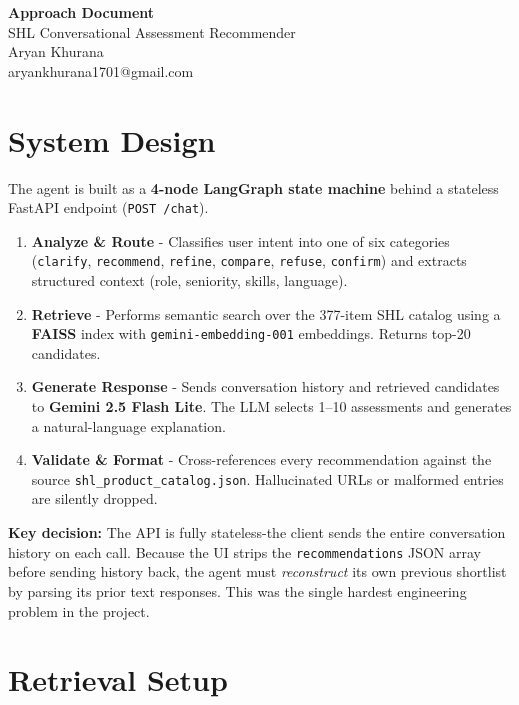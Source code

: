 \documentclass[11pt, a4paper]{article}
\begin{document}
\begin{center}
    {\LARGE \textbf{Approach Document}} \\[0.3em]
    {\large SHL Conversational Assessment Recommender} \\[0.2em]
    {\normalsize Aryan Khurana} \\[0.1em]
    {\normalsize aryankhurana1701@gmail.com}
\end{center}

\vspace{0.5em}

\section{System Design}

The agent is built as a \textbf{4-node LangGraph state machine} behind a stateless FastAPI endpoint (\texttt{POST /chat}).

\begin{enumerate}[leftmargin=1.5em, nosep]
    \item \textbf{Analyze \& Route} - Classifies user intent into one of six categories (\texttt{clarify}, \texttt{recommend}, \texttt{refine}, \texttt{compare}, \texttt{refuse}, \texttt{confirm}) and extracts structured context (role, seniority, skills, language).
    \item \textbf{Retrieve} - Performs semantic search over the 377-item SHL catalog using a \textbf{FAISS} index with \texttt{gemini-embedding-001} embeddings. Returns top-20 candidates.
    \item \textbf{Generate Response} - Sends conversation history and retrieved candidates to \textbf{Gemini 2.5 Flash Lite}. The LLM selects 1--10 assessments and generates a natural-language explanation.
    \item \textbf{Validate \& Format} - Cross-references every recommendation against the source \texttt{shl\allowbreak\_product\allowbreak\_catalog.json}. Hallucinated URLs or malformed entries are silently dropped.
\end{enumerate}

\textbf{Key decision:} The API is fully stateless-the client sends the entire conversation history on each call. Because the UI strips the \texttt{recommendations} JSON array before sending history back, the agent must \emph{reconstruct} its own previous shortlist by parsing its prior text responses. This was the single hardest engineering problem in the project.

\section{Retrieval Setup}
\end{document}
